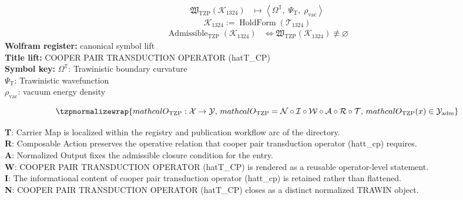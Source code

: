\noindent
\begin{minipage}[t]{0.48\linewidth}
\begingroup
\small
\[
\begin{aligned}
\mathfrak{W}_{\mathrm{TZP}}\!\left(\mathcal{K}_{1324}\right)
&\longmapsto
\left\langle \Omega^{\mathbb{T}},\; \Psi_{\mathrm{T}},\; \rho_{\mathrm{vac}} \right\rangle
\end{aligned}
\]
\[
\mathcal{K}_{1324}
:=
\operatorname{HoldForm}\!\left(\mathcal{T}_{1324}\right)
\]
\[
\begin{aligned}
\operatorname{Admissible}_{\mathrm{TZP}}\!\left(\mathcal{K}_{1324}\right)
&\Longleftrightarrow
\mathfrak{W}_{\mathrm{TZP}}\!\left(\mathcal{K}_{1324}\right)\not\equiv\varnothing
\end{aligned}
\]
\textbf{Wolfram register:} canonical symbol lift\\
\textbf{Title lift:} COOPER PAIR TRANSDUCTION OPERATOR (hatT\_CP)\\
\textbf{Symbol key:} \(\Omega^{\mathbb{T}}\): Trawinistic boundary curvature\\ \(\Psi_{\mathrm{T}}\): Trawinistic wavefunction\\ \(\rho_{\mathrm{vac}}\): vacuum energy density
\par
\endgroup
\end{minipage}\hfill
\begin{minipage}[t]{0.48\linewidth}
\[
\tzpnormalizewrap{mathcal{O}_{\mathrm{TZP}} : \mathcal{X} \to \mathcal{Y},\,mathcal{O}_{\mathrm{TZP}} = \mathcal{N}\circ \mathcal{I}\circ \mathcal{W}\circ \mathcal{A}\circ \mathcal{R}\circ \mathcal{T},\,mathcal{O}_{\mathrm{TZP}}(x) \in \mathcal{Y}_{\mathrm{adm}}}
\]

\small
\textbf{T}: Carrier Map is localized within the registry and publication workflow arc of the directory.\\
\textbf{R}: Composable Action preserves the operative relation that cooper pair transduction operator (hatt\_cp) requires.\\
\textbf{A}: Normalized Output fixes the admissible closure condition for the entry.\\
\textbf{W}: COOPER PAIR TRANSDUCTION OPERATOR (hatT\_CP) is rendered as a reusable operator-level statement.\\
\textbf{I}: The informational content of cooper pair transduction operator (hatt\_cp) is retained rather than flattened.\\
\textbf{N}: COOPER PAIR TRANSDUCTION OPERATOR (hatT\_CP) closes as a distinct normalized TRAWIN object.
\normalsize
\end{minipage}

